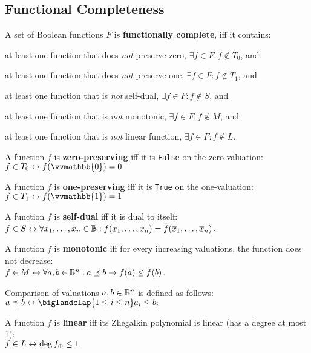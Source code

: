 \documentclass[a4paper,10pt]{article}
\begin{document}
\newpage
\subsection{Functional Completeness}

\begin{terms}
    \item A set of Boolean functions $F$ is \textbf{functionally complete}, iff it contains:
    \begin{terms}
        \item at least one function that does \textit{not} preserve zero, \ie $\exists f \in F: f \notin T_0$, and
        \item at least one function that does \textit{not} preserve one, \ie $\exists f \in F: f \notin T_1$, and
        \item at least one function that is \textit{not} self-dual, \ie $\exists f \in F: f \notin S$, and
        \item at least one function that is \textit{not} monotonic, \ie $\exists f \in F: f \notin M$, and
        \item at least one function that is \textit{not} linear function, \ie $\exists f \in F: f \notin L$.
    \end{terms}

    \item A function $f$ is \textbf{zero-preserving} iff it is \texttt{False} on the zero-valuation: \\
    $f \in T_0 \iff f(\vvmathbb{0}) = 0$

    \item A function $f$ is \textbf{one-preserving} iff it is \texttt{True} on the one-valuation: \\
    $f \in T_1 \iff f(\vvmathbb{1}) = 1$

    \item A function $f$ is \textbf{self-dual} iff it is dual to itself: \\
    $f \in S \mathrel{\leftrightarrow} \forall x_1,\dotsc,x_n \in \mathbb{B} : f(x_1, \dotsc, x_n) = \overline{f}(\overline{x}_1, \dotsc, \overline{x}_n)$.

    \item A function $f$ is \textbf{monotonic} iff for every increasing valuations, the function does not decrease: \\
    $f \in M \mathrel{\leftrightarrow} \forall a,b \in \mathbb{B}^n: a \preceq b \mathrel{\rightarrow} f(a) \leq f(b)$.

    \begin{terms}
        \item Comparison of valuations $a,b \in \mathbb{B}^n$ is defined as follows: \\
        $a \preceq b \iff \biglandclap{1 \leq i \leq n} a_i \leq b_i$
    \end{terms}


    \item A function $f$ is \textbf{linear} iff its Zhegalkin polynomial is linear (\ie has a degree at most 1): \\
    $f \in L \mathrel{\leftrightarrow} \operatorname{deg} f_{\oplus} \leq 1$
\end{terms}
\end{document}
